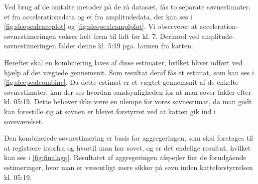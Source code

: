 Ved brug af de omtalte metoder på de rå datasæt, fås to separate søvnestimater, et fra accelerationsdata og et fra amplitudedata, der kan ses i \cref{fig:sleepcalcaccplot} og \cref{fig:sleepcalcamplplot}.
Vi observerer at acceleration-søvnestimeringen vokser helt frem til lidt før kl. 7.
Derimod ved amplitude-søvnestimeringen falder denne kl. 5:19 pga. larmen fra katten.
 
Herefter skal en kombinering laves af disse estimater, hvilket bliver udført ved hjælp af det vægtede gennemsnit.
Som resultat deraf fås et estimat, som kan ses i \cref{fig:sleepcalcombine}.
Da dette estimat er et vægtet gennemsnit af de enkelte søvnestimater, kan der ses hvordan sandsynligheden for at man sover falder efter kl. 05:19.
Dette behøver ikke være en ulempe for vores søvnestimat, da man godt kan forestille sig at søvnen er blevet forstyrret ved at katten gik ind i soveværelset.

Den kombinerede søvnestimering er basis for aggregeringen, som skal foretages til at registrere hvorfra og hvortil man har sovet, og er det endelige resultat, hvilket kan ses i \cref{fig:finalagg}.
Resultatet af aggregeringen afspejler fint de forudgående estimeringer, hvor man er væsentligt mere sikker på søvn inden katteforstyrrelsen kl. 05:19.